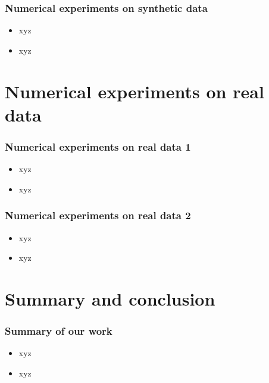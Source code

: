 \documentclass{beamer}
\begin{document}
\begin{frame}
\frametitle{Numerical experiments on synthetic data}
\begin{itemize}
\item xyz
\item xyz
\end{itemize}
\end{frame}


\section{Numerical experiments on real data}   \label{sec:NumExpReal}

\begin{frame}
\frametitle{Numerical experiments on real data 1}
\begin{itemize}
\item xyz
\item xyz
\end{itemize}
\end{frame}

\begin{frame}
\frametitle{Numerical experiments on real data 2}
\begin{itemize}
\item xyz
\item xyz
\end{itemize}
\end{frame}




\section{Summary and conclusion}  \label{sec:conclusion}

\begin{frame}
\frametitle{Summary of our work}
\begin{itemize}
\item xyz
\item xyz
\end{itemize}
\end{frame}
\end{document}
